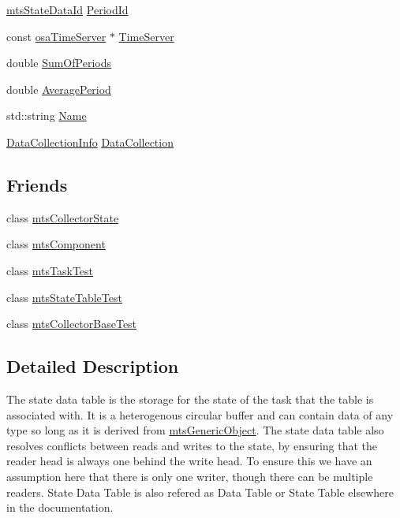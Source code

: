 \begin{DoxyCompactItemize}
\item 
\hyperlink{mts_state_table_8h_ac3a0e34e8991d51790b043fa01857a35}{mts\+State\+Data\+Id} \hyperlink{classmts_state_table_a1035a10fa91b94e61061abbd049d9eb6}{Period\+Id}
\item 
const \hyperlink{classosa_time_server}{osa\+Time\+Server} $\ast$ \hyperlink{classmts_state_table_a3d0a1bf75c293caad7ab30cd581b18e4}{Time\+Server}
\item 
double \hyperlink{classmts_state_table_a57adbe08f57772500f8066c64ad5b49b}{Sum\+Of\+Periods}
\item 
double \hyperlink{classmts_state_table_a5005978e1547af1b2b864fa366585468}{Average\+Period}
\item 
std\+::string \hyperlink{classmts_state_table_ad526708a4622c8cc4d9398bdb6b9ad5e}{Name}
\item 
\hyperlink{classmts_state_table_1_1_data_collection_info}{Data\+Collection\+Info} \hyperlink{classmts_state_table_ae1da5c16bcb4faa19c35c2cfb1dee023}{Data\+Collection}
\end{DoxyCompactItemize}
\subsection*{Friends}
\begin{DoxyCompactItemize}
\item 
class \hyperlink{classmts_state_table_ab6a86199b0302ca067ec09ec393d2ec5}{mts\+Collector\+State}
\item 
class \hyperlink{classmts_state_table_ae29f4c60efad294ccb670e319c43a4c1}{mts\+Component}
\item 
class \hyperlink{classmts_state_table_a6cdb4e8009fd76a9cf7e4e42b4bd0b8d}{mts\+Task\+Test}
\item 
class \hyperlink{classmts_state_table_a9113306eea81a3c08902921aefadbe22}{mts\+State\+Table\+Test}
\item 
class \hyperlink{classmts_state_table_a6743a1c340e3a1cc2078915e17f6678e}{mts\+Collector\+Base\+Test}
\end{DoxyCompactItemize}


\subsection{Detailed Description}
The state data table is the storage for the state of the task that the table is associated with. It is a heterogenous circular buffer and can contain data of any type so long as it is derived from \hyperlink{classmts_generic_object}{mts\+Generic\+Object}. The state data table also resolves conflicts between reads and writes to the state, by ensuring that the reader head is always one behind the write head. To ensure this we have an assumption here that there is only one writer, though there can be multiple readers. State Data Table is also refered as Data Table or State Table elsewhere in the documentation. 

